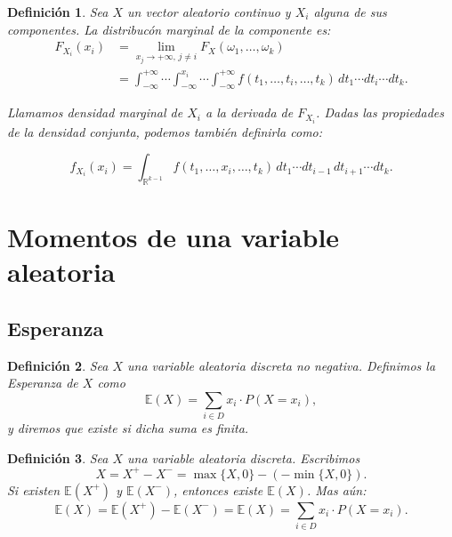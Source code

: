 \documentclass{report}
\newtheorem{dfn}{Definición}[section]
\begin{document}
\begin{dfn}
Sea $X$ un vector aleatorio continuo y $X_i$ alguna de sus componentes. La \emph{distribucón marginal} de la componente es:
\begin{equation*}
    \begin{split}
        F_{X_i}(x_i) & = \lim_{x_j \to +\infty, \, j \neq i} F_X(\omega_1, \dots, \omega_k)\\ 
        &= \int_{-\infty}^{+\infty} \cdots \int_{-\infty}^{x_i} \cdots \int_{-\infty}^{+\infty} 
        f(t_1, \dots, t_i, \dots, t_k) \, dt_1 \cdots dt_i \cdots dt_k.
    \end{split}
\end{equation*}

Llamamos \emph{densidad marginal} de \( X_i \) a la derivada de \( F_{X_i} \). Dadas las propiedades de la densidad conjunta,
podemos también definirla como:

\begin{equation*}
f_{X_i}(x_i) = \int_{\mathbb{R}^{k-1}} f(t_1, \dots, x_i, \dots, t_k) \, dt_1 \cdots dt_{i-1} \, dt_{i+1} \cdots dt_k.
\end{equation*}
\end{dfn}

\section{Momentos de una variable aleatoria}
\subsection{Esperanza}
\begin{dfn}
Sea $X$ una variable aleatoria discreta no negativa. Definimos la \emph{Esperanza} de $X$ como
\begin{equation*}
\mathbb{E}(X) = \sum_{i\in D} x_i \cdot P(X=x_i),
\end{equation*}
y diremos que existe si dicha suma es finita.    
\end{dfn}

\begin{dfn}
Sea $X$ una variable aleatoria discreta. Escribimos
\begin{equation*}
    X=X^+ - X^- = \max\{X,0\} - (-\min\{X,0\}).
\end{equation*}
Si existen $\mathbb{E}(X^+)$ y $\mathbb{E}(X^-)$, entonces existe $\mathbb{E}(X)$. Mas aún:
\begin{equation*}
    \mathbb{E}(X) = \mathbb{E}(X^+) - \mathbb{E}(X^-) = \mathbb{E}(X) = \sum_{i\in D} x_i \cdot P(X=x_i).
\end{equation*}
\end{dfn}
\end{document}

